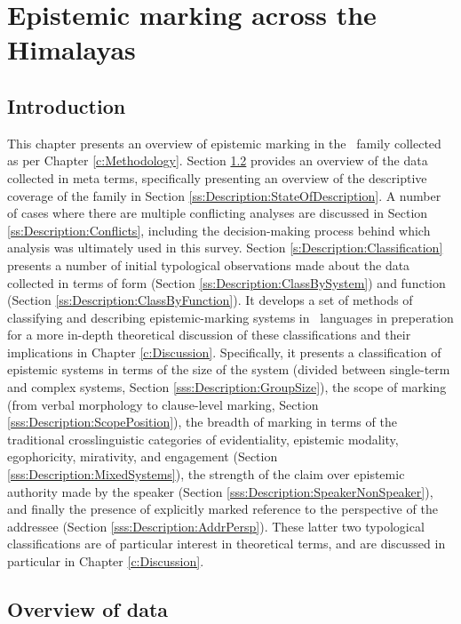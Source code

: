 \chapter{Epistemic marking across the Himalayas}\label{c:Description}
\section{Introduction}
This chapter presents an overview of epistemic marking in the \lfam\ family collected as per Chapter \ref{c:Methodology}. Section \ref{s:Description:Overview} provides an overview of the data collected in meta terms, specifically presenting an overview of the descriptive coverage of the family in Section \ref{ss:Description:StateOfDescription}. A number of cases where there are multiple conflicting analyses are discussed in Section \ref{ss:Description:Conflicts}, including the decision-making process behind which analysis was ultimately used in this survey. Section \ref{s:Description:Classification} presents a number of initial typological observations made about the data collected in terms of form (Section \ref{ss:Description:ClassBySystem}) and function (Section \ref{ss:Description:ClassByFunction}). It develops a set of methods of classifying and describing epistemic-marking systems in \lfam\ languages in preperation for a more in-depth theoretical discussion of these classifications and their implications in Chapter \ref{c:Discussion}. Specifically, it presents a classification of epistemic systems in terms of the size of the system (divided between single-term and complex systems, Section \ref{sss:Description:GroupSize}), the scope of marking (from verbal morphology to clause-level marking, Section \ref{sss:Description:ScopePosition}), the breadth of marking in terms of the traditional crosslinguistic categories of evidentiality, epistemic modality, egophoricity, mirativity, and engagement (Section \ref{sss:Description:MixedSystems}), the strength of the claim over epistemic authority made by the speaker (Section \ref{sss:Description:SpeakerNonSpeaker}), and finally the presence of explicitly marked reference to the perspective of the addressee (Section \ref{sss:Description:AddrPersp}). These latter two typological classifications are of particular interest in theoretical terms, and are discussed in particular in Chapter \ref{c:Discussion}. 
\section{Overview of data}\label{s:Description:Overview}
